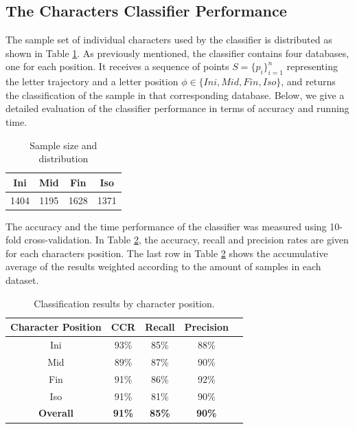 \subsection{The Characters Classifier Performance}
\iftoggle{edit-mode}{\hspace{0pt}\marginpar{The sample set}}{}
The sample set of individual characters used by the classifier is distributed as shown in Table \ref{table:sample_set}.
As previously mentioned, the classifier contains four databases, one for each position. 
It receives a sequence of points $S=\{p_{i}\}_{i=1}^{n}$ representing the letter trajectory and a letter position $\phi \in \{Ini, Mid, Fin, Iso\}$, and returns the classification of the sample in that corresponding database.
Below, we give a detailed evaluation of the classifier performance in terms of accuracy and running time.

\begin{table}[b]
\centering
\begin{tabular}{ | c | c | c | c |}
\hline                 
  Ini & Mid & Fin & Iso \\ 
  \hline
  1404 & 1195 & 1628 & 1371 \\
  \hline
\end{tabular}
\caption{Sample size and distribution}
\label{table:sample_set} 
\end{table}

The accuracy and the time performance of the classifier was measured using 10-fold cross-validation.
In Table \ref{table:results_position}, the accuracy, recall and precision rates are given for each characters position.
The last row in Table \ref{table:results_position} shows the accumulative average of the results weighted according to the amount of samples in each dataset.

\begin{table}
\centering
\renewcommand{\arraystretch}{1.2}
\begin{tabular}{ | c | c | c | c | c |}
\hline
	\textbf{Character Position} & \textbf{CCR} & \textbf{Recall} &  \textbf{Precision} \\
	\hline 
	Ini & 93\% & 85\% & 88\% \\                
  	\hline
  	Mid & 89\% & 87\% & 90\% \\
  	\hline
  	Fin & 91\% &  86\% & 92\% \\
  	\hline
  	Iso & 91\% &  81\% & 90\% \\
  	\hline
  	\textbf{Overall} & \textbf{91\%} &  \textbf{85\%} & \textbf{90\%} \\
  	\hline
\end{tabular}
\caption{Classification results by character position.}
\label{table:results_position} 
\end{table}

